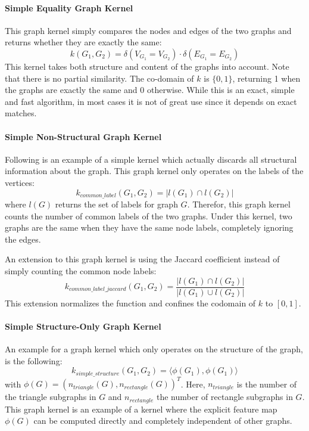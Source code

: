 \paragraph{Simple Equality Graph Kernel}
This graph kernel simply compares the nodes and edges of the two graphs and returns whether they are exactly the same:
\begin{equation*}
    k(G_1, G_2) = \delta(V_{G_1} = V_{G_2}) \cdot \delta(E_{G_1} = E_{G_2})
\end{equation*}
This kernel takes both structure and content of the graphs into account. Note that there is no partial similarity. The co-domain of $k$ is $\{0, 1\}$, returning 1 when the graphs are exactly the same and 0 otherwise.
While this is an exact, simple and fast algorithm, in most cases it is not of great use since it depends on exact matches.

\paragraph{Simple Non-Structural Graph Kernel}
Following is an example of a simple kernel which actually discards all structural information about the graph. This graph kernel only operates on the labels of the vertices:
\begin{equation*}
k_{common\_label}(G_1, G_2) = | l(G_1) \cap l(G_2) |
\end{equation*}
where $l(G)$ returns the set of labels for graph $G$.
Therefor, this graph kernel counts the number of common labels of the two graphs. Under this kernel, two graphs are the same when they have the same node labels, completely ignoring the edges.

An extension to this graph kernel is using the Jaccard coefficient instead of simply counting the common node labels:
\begin{equation*}
k_{common\_label\_jaccard}(G_1, G_2) = \frac{| l(G_1) \cap l(G_2) |}{| l(G_1) \cup l(G_2) |}
\end{equation*}
This extension normalizes the function and confines the codomain of $k$ to $[0, 1]$.

\paragraph{Simple Structure-Only Graph Kernel}
An example for a graph kernel which only operates on the structure of the graph, is the following:
\begin{equation*}
k_{simple\_structure}(G_1, G_2) = \langle \phi(G_1), \phi(G_1) \rangle
\end{equation*}
with $\phi(G) = (n_{triangle}(G), n_{rectangle}(G))^T$. Here, $n_{triangle}$ is the number of the triangle subgraphs in $G$ and $n_{rectangle}$ the number of rectangle subgraphs in $G$.
This graph kernel is an example of a kernel where the explicit feature map $\phi(G)$ can be computed directly and completely independent of other graphs.

